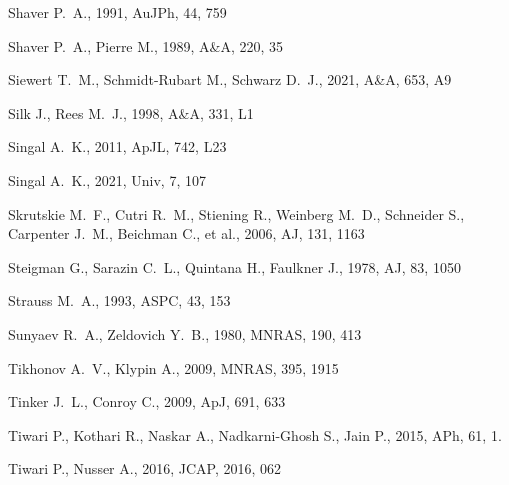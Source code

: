 \documentclass[fleqn,12pt]{article}
\begin{document}
\begin{thebibliography}{}
 Shaver P.~A., 1991, AuJPh, 44, 759

 Shaver P.~A., Pierre M., 1989, A\&A, 220, 35

 Siewert T.~M., Schmidt-Rubart M., Schwarz D.~J., 2021, A\&A, 653, A9

 Silk J., Rees M.~J., 1998, A\&A, 331, L1 %

 Singal A.~K., 2011, ApJL, 742, L23

 Singal A.~K., 2021, Univ, 7, 107

 Skrutskie M.~F., Cutri R.~M., Stiening R., Weinberg M.~D., Schneider S., Carpenter J.~M., Beichman C., et al., 2006, AJ, 131, 1163


 Steigman G., Sarazin C.~L., Quintana H., Faulkner J., 1978, AJ, 83, 1050

 Strauss M.~A., 1993, ASPC, 43, 153

 Sunyaev R.~A., Zeldovich Y.~B., 1980, MNRAS, 190, 413

 Tikhonov A.~V., Klypin A., 2009, MNRAS, 395, 1915

 Tinker J.~L., Conroy C., 2009, ApJ, 691, 633

 Tiwari P., Kothari R., Naskar A., Nadkarni-Ghosh S., Jain P., 2015, APh, 61, 1.

 Tiwari P., Nusser A., 2016, JCAP, 2016, 062


\end{thebibliography}
\end{document}
